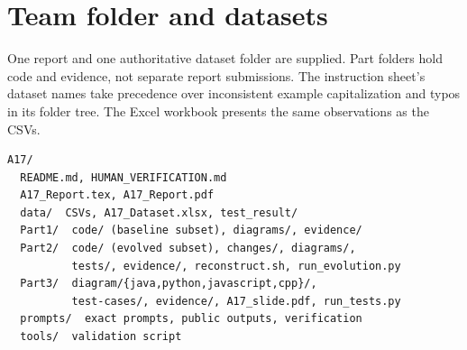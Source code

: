 \documentclass[11pt,a4paper]{article}
\begin{document}
\clearpage
\section{Team folder and datasets}
One report and one authoritative dataset folder are supplied. Part folders hold
code and evidence, not separate report submissions. The instruction sheet's
dataset names take precedence over inconsistent example capitalization and typos
in its folder tree. The Excel workbook presents the same observations as the CSVs.
\begin{lstlisting}
A17/
  README.md, HUMAN_VERIFICATION.md
  A17_Report.tex, A17_Report.pdf
  data/  CSVs, A17_Dataset.xlsx, test_result/
  Part1/  code/ (baseline subset), diagrams/, evidence/
  Part2/  code/ (evolved subset), changes/, diagrams/,
          tests/, evidence/, reconstruct.sh, run_evolution.py
  Part3/  diagram/{java,python,javascript,cpp}/,
          test-cases/, evidence/, A17_slide.pdf, run_tests.py
  prompts/  exact prompts, public outputs, verification
  tools/  validation script
\end{lstlisting}
\end{document}
